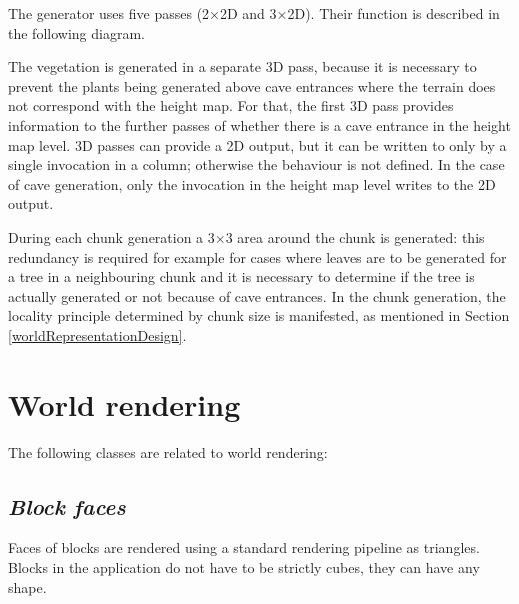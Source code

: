 The  generator uses five passes (2×2D and 3×2D). Their function is described in the following diagram.

The vegetation is generated in a separate 3D pass, because it is necessary to prevent the plants being generated above cave entrances where the terrain does not correspond with the height map. For that, the first 3D pass provides information to the further passes of whether there is a cave entrance in the height map level. 3D passes can provide a 2D output, but it can be written to only by a single invocation in a column; otherwise the behaviour is not defined. In the case of cave generation, only the invocation in the height map level writes to the 2D output.

During each chunk generation a 3×3 area around the chunk is generated: this redundancy is required for example for cases where leaves are to be generated for a tree in a neighbouring chunk and it is necessary to determine if the tree is actually generated or not because of cave entrances. In the chunk generation, the locality principle determined by chunk size is manifested, as mentioned in Section \ref{worldRepresentationDesign}.

\section{World rendering}
The following classes are related to world rendering:

\subsection{\textit{Block faces}}
Faces of blocks are rendered using a standard rendering pipeline as triangles. Blocks in the application do not have to be strictly cubes, they can have any shape.

